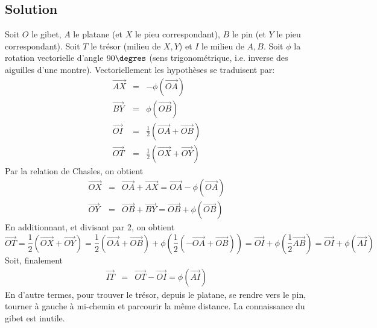 \documentclass{article}
\begin{document}
\subsection{Solution}
\begin{center}
\end{center}
Soit $O$ le gibet, $A$ le platane (et $X$ le pieu correspondant), $B$ le pin (et $Y$ le pieu correspondant). Soit $T$ le trésor (milieu de $X,Y$) et $I$ le milieu de $A,B$. Soit $\phi$ la rotation vectorielle d'angle $90\degres$ (sens trigonométrique, i.e. inverse des aiguilles d'une montre). Vectoriellement les hypothèses se traduisent par:
\begin{eqnarray*}
\overrightarrow{AX} & = & -\phi(\overrightarrow{OA}) \\
\overrightarrow{BY} & = & \phi(\overrightarrow{OB}) \\
\overrightarrow{OI} & = & \frac{1}{2} (\overrightarrow{OA}+\overrightarrow{OB}) \\
\overrightarrow{OT} & = & \frac{1}{2} (\overrightarrow{OX}+\overrightarrow{OY})
\end{eqnarray*}
Par la relation de Chasles, on obtient
\begin{eqnarray*}
\overrightarrow{OX} & = & \overrightarrow{OA}+\overrightarrow{AX} = \overrightarrow{OA} - \phi(\overrightarrow{OA}) \\
\overrightarrow{OY} & = & \overrightarrow{OB}+\overrightarrow{BY} = \overrightarrow{OB} + \phi(\overrightarrow{OB})
\end{eqnarray*}
En additionnant, et divisant par 2, on obtient
\[
\overrightarrow{OT} = \frac{1}{2} (\overrightarrow{OX}+\overrightarrow{OY}) =
\frac{1}{2} (\overrightarrow{OA}+\overrightarrow{OB}) +\phi(\frac{1}{2}(-\overrightarrow{OA}+\overrightarrow{OB})) =
\overrightarrow{OI}+\phi(\frac{1}{2}\overrightarrow{AB}) =
\overrightarrow{OI}+\phi(\overrightarrow{AI})
\]
Soit, finalement
\begin{eqnarray*}
\overrightarrow{IT} & = & \overrightarrow{OT}-\overrightarrow{OI} =\phi(\overrightarrow{AI})
\end{eqnarray*}
En d'autre termes, pour trouver le trésor, depuis le platane, se rendre vers le pin, tourner à gauche à mi-chemin et parcourir la même distance. La connaissance du gibet est inutile.
\pagebreak
\end{document}
